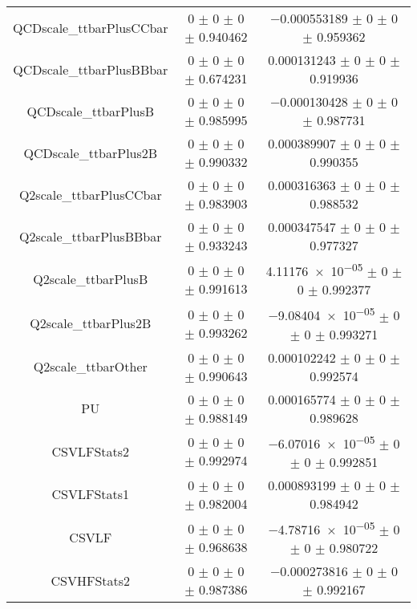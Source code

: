 \begin{table}
\begin{tabular}{ccc}
QCDscale\_ttbarPlusCCbar & \num{0} $\pm$ \num{0} $\pm$ \num{0} $\pm$ \num{0.940462} & \num{-0.000553189} $\pm$ \num{0} $\pm$ \num{0} $\pm$ \num{0.959362}\\
QCDscale\_ttbarPlusBBbar & \num{0} $\pm$ \num{0} $\pm$ \num{0} $\pm$ \num{0.674231} & \num{0.000131243} $\pm$ \num{0} $\pm$ \num{0} $\pm$ \num{0.919936}\\
QCDscale\_ttbarPlusB & \num{0} $\pm$ \num{0} $\pm$ \num{0} $\pm$ \num{0.985995} & \num{-0.000130428} $\pm$ \num{0} $\pm$ \num{0} $\pm$ \num{0.987731}\\
QCDscale\_ttbarPlus2B & \num{0} $\pm$ \num{0} $\pm$ \num{0} $\pm$ \num{0.990332} & \num{0.000389907} $\pm$ \num{0} $\pm$ \num{0} $\pm$ \num{0.990355}\\
Q2scale\_ttbarPlusCCbar & \num{0} $\pm$ \num{0} $\pm$ \num{0} $\pm$ \num{0.983903} & \num{0.000316363} $\pm$ \num{0} $\pm$ \num{0} $\pm$ \num{0.988532}\\
Q2scale\_ttbarPlusBBbar & \num{0} $\pm$ \num{0} $\pm$ \num{0} $\pm$ \num{0.933243} & \num{0.000347547} $\pm$ \num{0} $\pm$ \num{0} $\pm$ \num{0.977327}\\
Q2scale\_ttbarPlusB & \num{0} $\pm$ \num{0} $\pm$ \num{0} $\pm$ \num{0.991613} & \num{4.11176e-05} $\pm$ \num{0} $\pm$ \num{0} $\pm$ \num{0.992377}\\
Q2scale\_ttbarPlus2B & \num{0} $\pm$ \num{0} $\pm$ \num{0} $\pm$ \num{0.993262} & \num{-9.08404e-05} $\pm$ \num{0} $\pm$ \num{0} $\pm$ \num{0.993271}\\
Q2scale\_ttbarOther & \num{0} $\pm$ \num{0} $\pm$ \num{0} $\pm$ \num{0.990643} & \num{0.000102242} $\pm$ \num{0} $\pm$ \num{0} $\pm$ \num{0.992574}\\
PU & \num{0} $\pm$ \num{0} $\pm$ \num{0} $\pm$ \num{0.988149} & \num{0.000165774} $\pm$ \num{0} $\pm$ \num{0} $\pm$ \num{0.989628}\\
CSVLFStats2 & \num{0} $\pm$ \num{0} $\pm$ \num{0} $\pm$ \num{0.992974} & \num{-6.07016e-05} $\pm$ \num{0} $\pm$ \num{0} $\pm$ \num{0.992851}\\
CSVLFStats1 & \num{0} $\pm$ \num{0} $\pm$ \num{0} $\pm$ \num{0.982004} & \num{0.000893199} $\pm$ \num{0} $\pm$ \num{0} $\pm$ \num{0.984942}\\
CSVLF & \num{0} $\pm$ \num{0} $\pm$ \num{0} $\pm$ \num{0.968638} & \num{-4.78716e-05} $\pm$ \num{0} $\pm$ \num{0} $\pm$ \num{0.980722}\\
CSVHFStats2 & \num{0} $\pm$ \num{0} $\pm$ \num{0} $\pm$ \num{0.987386} & \num{-0.000273816} $\pm$ \num{0} $\pm$ \num{0} $\pm$ \num{0.992167}\\

\end{tabular}
\end{table}

